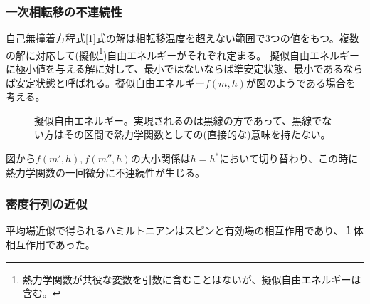 \documentclass[autodetect-engine,dvipdfmx-if-dvi,ja=standard]{bxjsarticle}
\theoremstyle{break}
\begin{document}
            \subsubsection{一次相転移の不連続性}
                自己無撞着方程式\eqref{1}式の解は相転移温度を超えない範囲で3つの値をもつ。複数の解に対応して(擬似\footnote{熱力学関数が共役な変数を引数に含むことはないが、擬似自由エネルギーは含む。})自由エネルギーがそれぞれ定まる。
                擬似自由エネルギーに極小値を与える解に対して、最小ではないならば準安定状態、最小であるならば安定状態と呼ばれる。擬似自由エネルギー$f(m,h)$が図のようである場合を考える。
                \begin{figure}
                    \begin{center}
                    \end{center}
                    \caption{擬似自由エネルギー。実現されるのは黒線の方であって、黒線でない方はその区間で熱力学関数としての(直接的な)意味を持たない。}
                \end{figure}
                図から$f(m',h),f(m'',h)$の大小関係は$h=h^*$において切り替わり、この時に熱力学関数の一回微分に不連続性が生じる。
            \subsubsection{密度行列の近似}
                平均場近似で得られるハミルトニアンはスピンと有効場の相互作用であり、１体相互作用であった。
               
\end{document}
